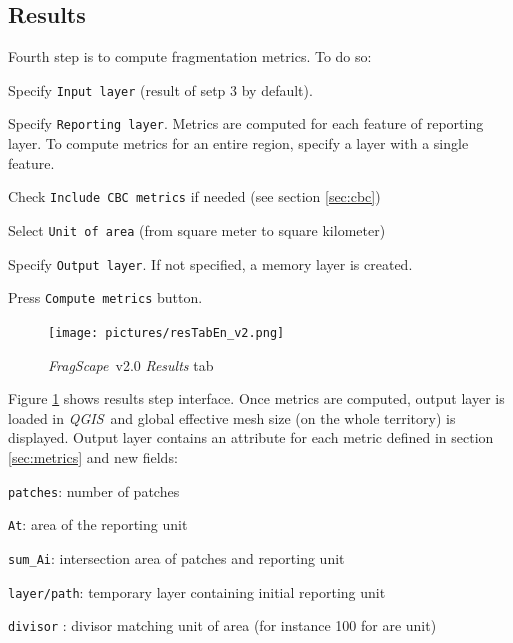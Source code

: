 \documentclass[11pt]{article}
\newcommand{\source}[1]{\vspace*{-0.4cm}\caption*{\textit{Source: {#1}}}}
\newcommand{\tool}{\emph{FragScape}}
\newcommand{\qgis}{\emph{QGIS}}
\let\tempone\itemize
\let\temptwo\enditemize
\renewenvironment{itemize}{\tempone\addtolength{\itemsep}{-0.5\baselineskip}}{\temptwo}
\begin{document}
\pagebreak

\subsection{Results}

Fourth step is to compute fragmentation metrics. To do so:

\begin{itemize}
    \item Specify \texttt{Input layer} (result of setp 3 by default).
    \item Specify \texttt{Reporting layer}. Metrics are computed for each feature of reporting layer. To compute metrics for an entire region, specify a layer with a single feature.
    \item Check \texttt{Include CBC metrics} if needed (see section \ref{sec:cbc})
    \item Select \texttt{Unit of area} (from square meter to square kilometer)
    \item Specify \texttt{Output layer}. If not specified, a memory layer is created.
    \item Press \texttt{Compute metrics} button.
\end{itemize}

\begin{figure}[h!]
    \centering
    \texttt{[image: pictures/resTabEn\_v2.png]}
    \caption{\tool\ v2.0 \textit{Results} tab}
    \label{fig:resultsTab}
\end{figure}


Figure \ref{fig:resultsTab} shows results step interface. Once metrics are computed, output layer is loaded in \qgis\ and global effective mesh size (on the whole territory) is displayed. Output layer contains an attribute for each metric defined in section \ref{sec:metrics} and new fields:
\begin{itemize}
    \item \texttt{patches}: number of patches
    \item \texttt{At}: area of the reporting unit
    \item \texttt{sum\_Ai}: intersection area of patches and reporting unit
    \item \texttt{layer/path}: temporary layer containing initial reporting unit
    \item \texttt{divisor} : divisor matching unit of area (for instance 100 for are unit)
\end{itemize}
\end{document}
